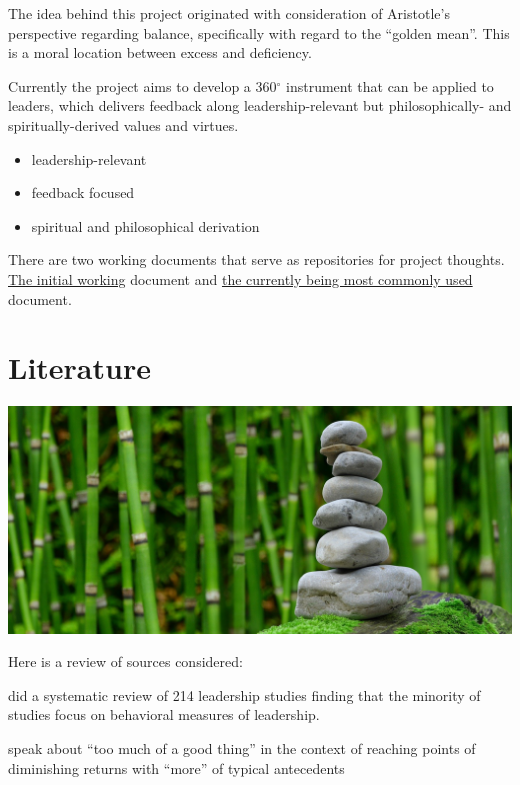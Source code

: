 \documentclass[
]{book}
\providecommand{\tightlist}{%
  \setlength{\itemsep}{0pt}\setlength{\parskip}{0pt}}
\begin{document}
The idea behind this project originated with consideration of Aristotle's perspective regarding balance, specifically with regard to the ``golden mean''. This is a moral location between excess and deficiency.

Currently the project aims to develop a 360\(^{\circ}\) instrument that can be applied to leaders, which delivers feedback along leadership-relevant but philosophically- and spiritually-derived values and virtues.

\begin{itemize}
\tightlist
\item
  leadership-relevant
\item
  feedback focused
\item
  spiritual and philosophical derivation
\end{itemize}

There are two working documents that serve as repositories for project thoughts. \href{https://docs.google.com/document/d/1p81MrX7OqYGDXCxKIOJcDu0b73kf9YULHpWYhjWS0dI/edit?usp=sharing}{The initial working} document and \href{https://docs.google.com/document/d/1eRxcsNCrdmKVSGAQuriNUAjPG9SuAJ_q/edit?usp=sharing\&ouid=106149280369729835297\&rtpof=true\&sd=true}{the currently being most commonly used} document.

\hypertarget{literature}{%
\chapter{Literature}\label{literature}}

\includegraphics{stones-ge8c321976_1920.jpg}

Here is a review of sources considered:

\citet{banks2021behavior} did a systematic review of 214 leadership studies finding that the minority of studies focus on behavioral measures of leadership.

\citet{pierce2013too} speak about ``too much of a good thing'' in the context of reaching points of diminishing returns with ``more'' of typical antecedents
\end{document}
